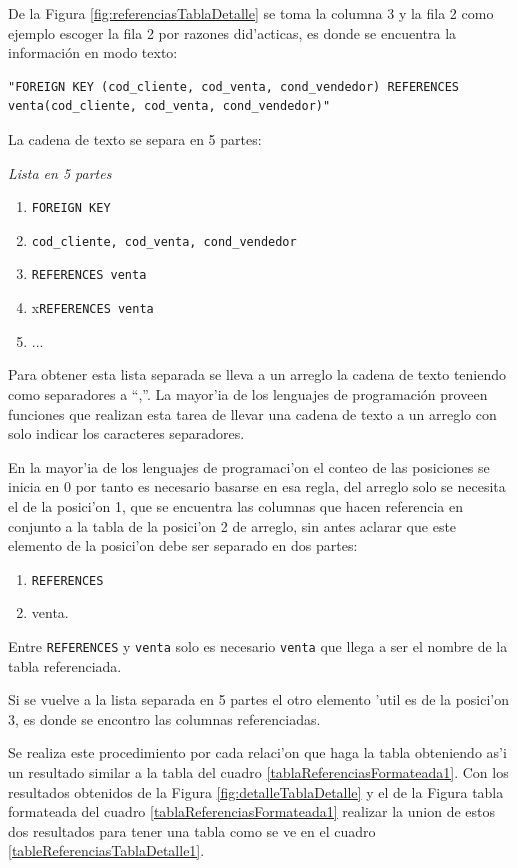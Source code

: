 De la Figura \ref{fig:referenciasTablaDetalle} se toma la columna 3 y la fila 2 como ejemplo escoger la fila 2 por razones did'acticas, es donde se encuentra la informaci\'on en modo texto:
\lstset{language=sql,breaklines=true}
\begin{lstlisting}
"FOREIGN KEY (cod_cliente, cod_venta, cond_vendedor) REFERENCES venta(cod_cliente, cod_venta, cond_vendedor)"
\end{lstlisting}
 La cadena de texto se separa en 5 partes:
 
 \textit{Lista en 5 partes}
 \begin{enumerate}
 \item \texttt{FOREIGN KEY}
 \item \texttt{cod\_cliente, cod\_venta, cond\_vendedor}
 \item \texttt{REFERENCES venta}
 \item x\texttt{REFERENCES venta}
 \item ...
 \end{enumerate}
 
 Para obtener esta lista separada se lleva a un arreglo la cadena de texto teniendo como separadores a ``,''. La mayor'ia de los lenguajes de programaci\'on proveen funciones que realizan esta tarea de llevar una cadena de texto a un arreglo con solo indicar los caracteres separadores.
 
 En la mayor'ia de los lenguajes de programaci'on el conteo de las posiciones se inicia en 0 por tanto es necesario basarse en esa regla, del arreglo solo se necesita el de la posici'on 1, que se encuentra las columnas que hacen referencia en conjunto a la tabla de la posici'on 2 de arreglo, sin antes aclarar que este elemento de la posici'on debe ser separado en dos partes:
 
\textit{} 
 \begin{enumerate}
 \item \texttt{REFERENCES}
 \item venta.
\end{enumerate}  

Entre \texttt{REFERENCES} y \texttt{venta} solo es necesario \texttt{venta} que llega a ser el nombre de la tabla referenciada.

Si se vuelve a la lista separada en 5 partes el otro elemento 'util es de la posici'on 3, es donde se encontro las columnas referenciadas.

Se realiza este procedimiento por cada relaci'on que haga la tabla obteniendo as'i un resultado similar a la tabla del cuadro \ref{tablaReferenciasFormateada1}.
Con los resultados obtenidos de la Figura \ref{fig:detalleTablaDetalle} y el de la Figura tabla formateada del cuadro \ref{tablaReferenciasFormateada1} realizar la union de estos dos resultados para tener una tabla como se ve en el cuadro \ref{tableReferenciasTablaDetalle1}.

